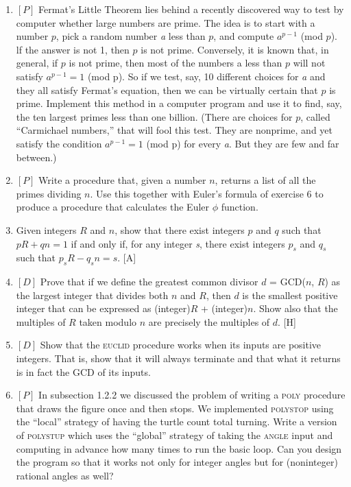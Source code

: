 \documentclass{book}
\begin{document}
\begin{enumerate}
\item $[P]$ Fermat's Little Theorem lies behind a recently discovered way to
test by computer whether large numbers are prime. The idea is to start
with a number $p$, pick a random number {\em a} less than $p$, and compute
$a^{p-1}$ (mod $p$). lf the answer is not 1, then $p$ is not prime. Conversely,
it is known that, in general, if $p$ is not prime, then most of the numbers
a less than $p$ will not satisfy $a^{p-1} = 1$ (mod p). So if we test, say, 10
different choices for {\em a} and they all satisfy Fermat's equation, then we
can be virtually certain that $p$ is prime. Implement this method in a
computer program and use it to find, say, the ten largest primes less
than one billion. (There are choices for $p$, called ``Carmichael numbers,''
that will fool this test. They are nonprime, and yet satisfy the condition
$a^{p-1} = 1$ (mod p) for every {\em a}. But they are few and far between.)
\item $[P]$ Write a procedure that, given a number $n$, returns a list of all the
primes dividing $n$. Use this together with Euler's formula of exercise 6
to produce a procedure that calculates the Euler $\phi$ function.
\item Given integers $R$ and $n$, show that there exist integers $p$ and $q$ such
that $pR + qn = 1$ if and only if, for any integer {\em s}, there exist integers
$p_s$ and $q_s$ such that $p_sR - q_sn = s$. [A]
\item $[D]$ Prove that if we define the greatest common divisor $d$ =
GCD($n$, $R$) as the largest integer that divides both $n$ and $R$, then $d$ is the
smallest positive integer that can be expressed as (integer)$R$ + (integer)$n$.
Show also that the multiples of $R$ taken modulo $n$ are precisely the
multiples of $d$. [H]
\item $[D]$ Show that the \textsc{euclid} procedure works when its inputs are
positive integers. That is, show that it will always terminate and that
what it returns is in fact the GCD of its inputs.
\item $[P]$ In subsection 1.2.2 we discussed the problem of writing a \textsc{poly}
procedure that draws the figure once and then stops. We implemented
\textsc{polystop} using the ``local'' strategy of having the turtle count total
turning. Write a version of \textsc{polystup} which uses the ``global'' strategy
of taking the \textsc{angle} input and computing in advance how many times
to run the basic loop. Can you design the program so that it works not
only for integer angles but for (noninteger) rational angles as well?

\end{enumerate}
\end{document}
